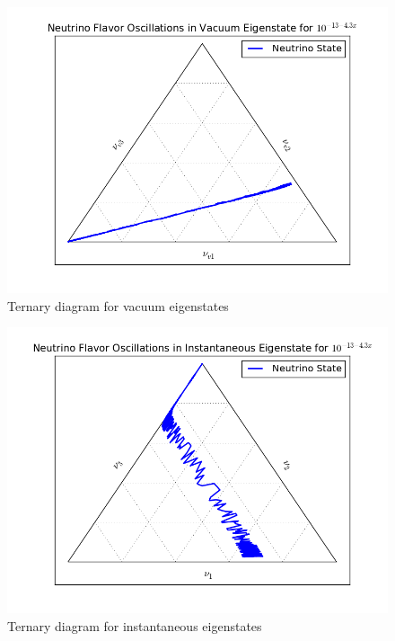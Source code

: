 \documentclass{tufte-handout}
\begin{document}
\begin{figure}
\centering
\includegraphics{assets/ternary/matter-vac-eigen-e-1.png}
\caption{Ternary diagram for vacuum eigenstates}
\label{fig:matter-vac-eigen-e-1}
\end{figure}



\begin{figure}
\centering
\includegraphics{assets/ternary/matter-inst-eigen-e-1.png}
\caption{Ternary diagram for instantaneous eigenstates}
\label{fig:matter-inst-eigen-e-1}
\end{figure}
\end{document}
